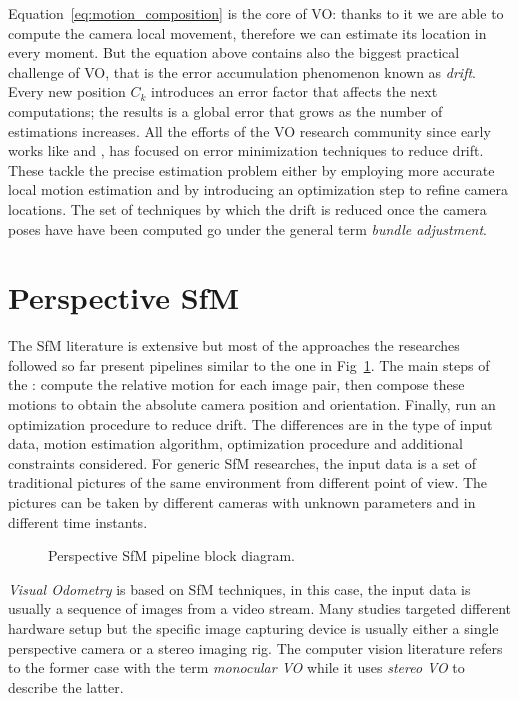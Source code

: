 Equation~\ref{eq:motion_composition} is the core of VO: thanks to it we are able
to compute the camera local movement, therefore we can estimate its location in 
every moment. But the equation above contains also the biggest practical 
challenge of VO, that is the error accumulation phenomenon known as 
\textit{drift}.
Every new position $C_k$ introduces an error factor that affects the next 
computations; the results is a global error that grows as the number of 
estimations increases.
All the efforts of the VO research community since early works like 
\cite{harris19883d} and \cite{moravec1980obstacle}, has focused on error
minimization techniques to reduce drift.
These tackle the precise estimation problem either by employing more accurate
local motion estimation and by introducing an optimization step to refine 
camera locations.
The set of techniques by which the drift is reduced once the camera poses have 
have been computed go under the general term \textit{bundle adjustment}.

\section{Perspective SfM}
The SfM literature is extensive but most of the approaches the 
researches followed so far present pipelines similar to the one in 
Fig~\ref{fig:block_diagram}.
The main steps of the : compute the relative motion for each image
pair, then compose these motions to obtain the absolute camera position and 
orientation. Finally, run an optimization procedure to reduce drift.
The differences are in the type of input data, motion estimation algorithm,
optimization procedure and additional constraints considered.
For generic SfM researches, the input data is a set of traditional pictures of 
the same environment from different point of view. The pictures can be taken by 
different cameras with unknown parameters and in different time instants.
\begin{figure}
	\label{fig:block_diagram}
   \centering
    \def\svgwidth{0.5\columnwidth}
    
    \caption{Perspective SfM pipeline block diagram.}
\end{figure}
\textit{Visual Odometry} is based on SfM techniques, 
in this case, the input data is usually a sequence 
of images from a video stream. Many studies targeted different hardware setup 
but the specific image capturing device is usually either a single perspective 
camera or a stereo imaging rig. The computer vision literature refers to the
former case with the term \textit{monocular VO} while it uses \textit{stereo VO}
to describe the latter.

